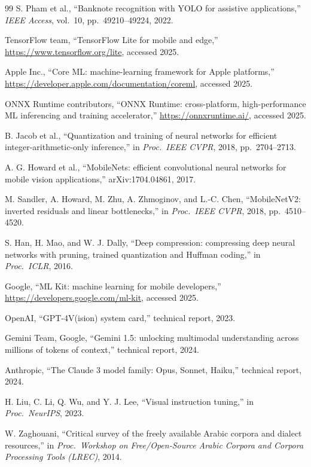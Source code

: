 \documentclass[11pt,a4paper]{article}
\begin{document}
\begin{thebibliography}{99}
S. Pham et al., ``Banknote recognition with YOLO for assistive
applications,'' \emph{IEEE Access}, vol.\ 10, pp.\ 49210--49224, 2022.

TensorFlow team, ``TensorFlow Lite for mobile and edge,''
\url{https://www.tensorflow.org/lite}, accessed 2025.

Apple Inc., ``Core ML: machine-learning framework for Apple platforms,''
\url{https://developer.apple.com/documentation/coreml}, accessed 2025.

ONNX Runtime contributors, ``ONNX Runtime: cross-platform,
high-performance ML inferencing and training accelerator,''
\url{https://onnxruntime.ai/}, accessed 2025.

B. Jacob et al., ``Quantization and training of neural networks for
efficient integer-arithmetic-only inference,'' in \emph{Proc.\ IEEE
CVPR}, 2018, pp.\ 2704--2713.

A. G. Howard et al., ``MobileNets: efficient convolutional neural
networks for mobile vision applications,'' arXiv:1704.04861, 2017.

M. Sandler, A. Howard, M. Zhu, A. Zhmoginov, and L.-C. Chen,
``MobileNetV2: inverted residuals and linear bottlenecks,'' in
\emph{Proc.\ IEEE CVPR}, 2018, pp.\ 4510--4520.

S. Han, H. Mao, and W. J. Dally, ``Deep compression: compressing deep
neural networks with pruning, trained quantization and Huffman
coding,'' in \emph{Proc.\ ICLR}, 2016.

Google, ``ML Kit: machine learning for mobile developers,''
\url{https://developers.google.com/ml-kit}, accessed 2025.

OpenAI, ``GPT-4V(ision) system card,'' technical report, 2023.

Gemini Team, Google, ``Gemini 1.5: unlocking multimodal understanding
across millions of tokens of context,'' technical report, 2024.

Anthropic, ``The Claude 3 model family: Opus, Sonnet, Haiku,''
technical report, 2024.

H. Liu, C. Li, Q. Wu, and Y. J. Lee, ``Visual instruction tuning,'' in
\emph{Proc.\ NeurIPS}, 2023.

W. Zaghouani, ``Critical survey of the freely available Arabic corpora
and dialect resources,'' in \emph{Proc.\ Workshop on Free/Open-Source
Arabic Corpora and Corpora Processing Tools (LREC)}, 2014.


\end{thebibliography}
\end{document}
